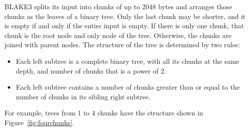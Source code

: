 \documentclass[11pt,notitlepage,a4paper]{article}
\begin{document}
BLAKE3 splits its input into chunks of up to 2048 bytes and arranges those
chunks as the leaves of a binary tree. Only the last chunk may be shorter, and
it is empty if and only if the entire input is empty. If there is only one
chunk, that chunk is the root node and only node of the tree. Otherwise, the
chunks are joined with parent nodes. The structure of the tree is determined by
two rules:
\begin{itemize}
    \item Each left subtree is a complete binary tree, with all its chunks at
        the same depth, and number of chunks that is a power of 2.
    \item Each left subtree contains a number of chunks greater than or equal
        to the number of chunks in its sibling right subtree.
\end{itemize}
For example, trees from 1 to 4 chunks have the structure shown in
Figure~\ref{fig:fourchunks}.
\end{document}
